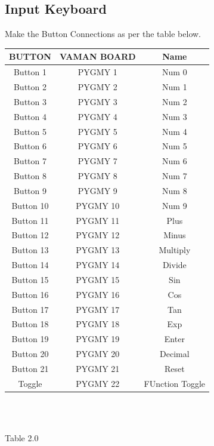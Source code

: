 \documentclass[conference]{IEEEtran}
\begin{document}
\begin{FlushLeft}
\subsection{Input Keyboard}
\raggedright
Make the Button Connections as per the table below.\\
\vspace{0.25cm}
\centering
\begin{tabular}{|c|c|c|}
\hline
BUTTON & VAMAN BOARD & Name\\
\hline
Button 1 & PYGMY 1 & Num 0\\
\hline
Button 2 & PYGMY 2 & Num 1\\
\hline
Button 3 & PYGMY 3 & Num 2\\
\hline
Button 4 & PYGMY 4 & Num 3\\
\hline
Button 5 & PYGMY 5 & Num 4\\
\hline
Button 6 & PYGMY 6 & Num 5\\
\hline
Button 7& PYGMY 7& Num 6\\
\hline
Button 8 & PYGMY 8 & Num 7\\
\hline
Button 9 & PYGMY 9 & Num 8\\
\hline
Button 10 & PYGMY 10 & Num 9\\
\hline
Button 11 & PYGMY 11& Plus \\
\hline
Button 12 & PYGMY 12 & Minus\\
\hline
Button 13 & PYGMY 13 & Multiply\\
\hline
Button 14 & PYGMY 14 & Divide\\
\hline
Button 15 & PYGMY 15 & Sin\\
\hline
Button 16 & PYGMY 16 & Cos\\
\hline
Button 17 & PYGMY 17 & Tan\\
\hline
Button 18 & PYGMY 18 & Exp\\
\hline
Button 19 & PYGMY 19 & Enter\\
\hline
Button 20 & PYGMY 20 & Decimal\\
\hline
Button 21 & PYGMY 21 & Reset\\
\hline
Toggle & PYGMY 22 & FUnction Toggle\\
\hline
\end{tabular}\\
\
\centerline{Table 2.0}

\end{FlushLeft}
\end{document}
